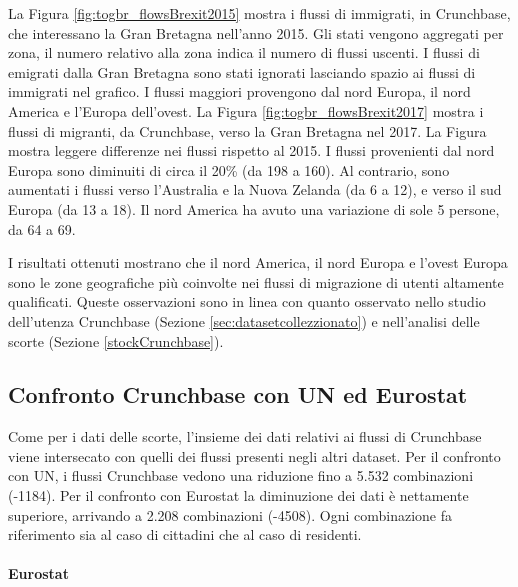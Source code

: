 La Figura \ref{fig:togbr_flowsBrexit2015} mostra i flussi di immigrati, in Crunchbase, che interessano la Gran Bretagna nell'anno 2015. Gli stati vengono aggregati per zona, il numero relativo alla zona indica il numero di flussi uscenti. I flussi di emigrati dalla Gran Bretagna sono stati ignorati lasciando spazio ai flussi di immigrati nel grafico. I flussi maggiori provengono dal nord Europa, il nord America e l'Europa dell'ovest. 
La Figura \ref{fig:togbr_flowsBrexit2017} mostra i flussi di migranti, da Crunchbase, verso la Gran Bretagna nel 2017. La Figura mostra leggere differenze nei flussi rispetto al 2015. I flussi provenienti dal nord Europa sono diminuiti di circa il 20\% (da 198 a 160). 
Al contrario, sono aumentati i flussi verso l'Australia e la Nuova Zelanda (da 6 a 12), e verso il sud Europa (da 13 a 18). Il nord America ha avuto una variazione di sole 5 persone, da 64 a 69. 

I risultati ottenuti mostrano che il nord America, il nord Europa e l'ovest Europa sono le zone geografiche più coinvolte nei flussi di migrazione di utenti altamente qualificati. Queste osservazioni sono in linea con quanto osservato nello studio dell'utenza Crunchbase (Sezione \ref{sec:datasetcollezzionato}) e nell'analisi delle scorte (Sezione \ref{stockCrunchbase}).

\FloatBarrier
\subsection{Confronto Crunchbase con UN ed Eurostat} 
Come per i dati delle scorte, l'insieme dei dati relativi ai flussi di Crunchbase viene intersecato con quelli dei flussi presenti negli altri dataset. 
Per il confronto con UN, i flussi Crunchbase vedono una riduzione fino a 5.532 combinazioni (-1184). Per il confronto con Eurostat la diminuzione dei dati è nettamente superiore, arrivando a 2.208 combinazioni (-4508). Ogni combinazione fa riferimento sia al caso di cittadini che al caso di residenti.

\paragraph{Eurostat} 
\label{ESTAT_original}

